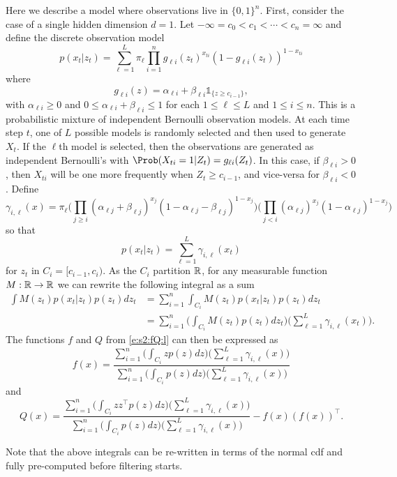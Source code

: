 Here we describe a model where observations live in $\{0,1\}^n$. First, consider the case of a single hidden dimension $d=1$. Let $-\infty=c_0<c_1<\dotsb<c_n=\infty$ and define the discrete observation model
\[ p(x_t|z_t) = \textstyle \sum_{\ell=1}^L \pi_\ell \prod_{i=1}^n g_{\ell i}(z_t)^{x_{ti}}(1-g_{\ell i}(z_t))^{1-x_{ti}} \]
where
\[ g_{\ell i}(z) = \textstyle \alpha_{\ell i} + \beta_{\ell i} \mathds{1}_{\{z\ge c_{i-1}\}}, \]
with $\alpha_{\ell i} \geq 0$ and $0 \leq \alpha_{\ell i}+\beta_{\ell i} \leq 1$ for each $1\leq \ell \leq L$ and $ 1\leq i \leq n$.  This is a probabilistic mixture of independent Bernoulli observation models. At each time step $t$, one of $L$ possible models is randomly selected and then used to generate $X_t$. If the $\ell$th model is selected, then the observations are generated as independent Bernoulli's with $\Prob(X_{ti}=1|Z_t)=g_{\ell i}(Z_t)$. In this case, if $\beta_{\ell i} > 0$, then $X_{ti}$ will be one more frequently when $Z_t\ge c_{i-1}$, and vice-versa for $\beta_{\ell i} < 0$.    Define
\[\gamma_{i,\ell}(x) = \pi_\ell \big( \textstyle \prod_{j\ge i} (\alpha_{\ell j} + \beta_{\ell j} )^{x_j}(1-\alpha_{\ell j} - \beta_{\ell j} )^{1-x_j} \big) \big(\textstyle \prod_{j< i} (\alpha_{\ell j} )^{x_j}(1-\alpha_{\ell j})^{1-x_j}\big) \]
so that
\[
p(x_t|z_t) = \textstyle \sum_{\ell=1}^L \gamma_{i,\ell}(x_t)
\]
for $z_t$ in $C_i=[c_{i-1},c_i)$. As the $C_i$ partition $\mathbb{R}$, for any measurable function $M:\mathbb{R}\rightarrow\mathbb{R}$ we can rewrite the following integral as a sum
\begin{align*}
\textstyle \int M(z_t) p(x_t|z_t) p(z_t) dz_t
&=\textstyle \sum_{i=1}^n \int_{C_i} M(z_t) p(x_t|z_t) p(z_t) dz_t \\
&=\textstyle \sum_{i=1}^n  \big(\int_{C_i} M(z_t) p(z_t) dz_t\big) \big(\sum_{\ell=1}^L   \gamma_{i,\ell}(x_t)\big).
\end{align*}
The functions $f$ and $Q$ from \eqref{e:s2:fQ:l} can then be expressed as
\[
f(x) = \frac{\sum_{i=1}^n  \big(\int_{C_i} z p(z) dz\big) \big(\sum_{\ell=1}^L   \gamma_{i,\ell}(x)\big)}{\sum_{i=1}^n  \big(\int_{C_i} p(z) dz\big) \big(\sum_{\ell=1}^L   \gamma_{i,\ell}(x)\big)}
\]
and
\[Q(x) = \frac{\sum_{i=1}^n  \big(\int_{C_i} zz^\intercal p(z) dz\big) \big(\sum_{\ell=1}^L   \gamma_{i,\ell}(x)\big)}{\sum_{i=1}^n  \big(\int_{C_i} p(z) dz\big) \big(\sum_{\ell=1}^L   \gamma_{i,\ell}(x)\big)}  - f(x) (f(x))^\intercal.\]

Note that the above integrals can be re-written in terms of the normal cdf and fully pre-computed before filtering starts. %

